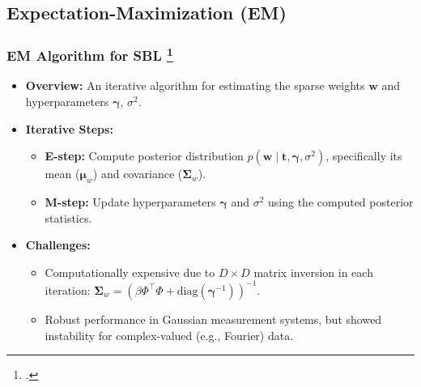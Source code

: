 \documentclass{beamer}
\begin{document}
\subsection{Expectation-Maximization (EM)}
\begin{frame}
    \frametitle{EM Algorithm for SBL \footcite{wipf2004sparse}}
    \begin{itemize}
        \item \textbf{Overview:} An iterative algorithm for estimating the sparse weights $\mathbf{w}$ and hyperparameters $\boldsymbol{\gamma}$, $\sigma^2$.
        \item \textbf{Iterative Steps:}
        \begin{itemize}
            \item \textbf{E-step:} Compute posterior distribution $p(\mathbf{w} \mid \mathbf{t}, \boldsymbol{\gamma}, \sigma^2)$, specifically its mean ($\boldsymbol{\mu}_w$) and covariance ($\boldsymbol{\Sigma}_w$).
            \item \textbf{M-step:} Update hyperparameters $\boldsymbol{\gamma}$ and $\sigma^2$ using the computed posterior statistics.
        \end{itemize}
        \item \textbf{Challenges:}
        \begin{itemize}
            \item Computationally expensive due to $D \times D$ matrix inversion in each iteration: $\boldsymbol{\Sigma}_w = \left( \beta \Phi^\top \Phi + \mathrm{diag}(\boldsymbol{\gamma}^{-1}) \right)^{-1}$.
            \item Robust performance in Gaussian measurement systems, but showed instability for complex-valued (e.g., Fourier) data.
        \end{itemize}
    \end{itemize}
\end{frame}
\end{document}
